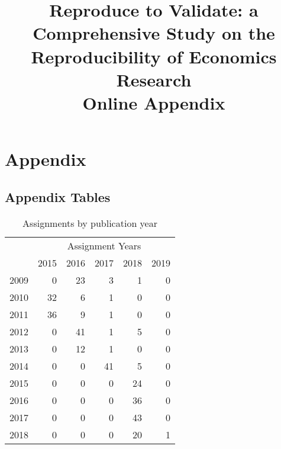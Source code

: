\documentclass{cje_appendix} %
\theoremstyle{plain}%
\theoremstyle{definition}
\theoremstyle{remark}
\begin{document}
\title[]{Reproduce to Validate: a Comprehensive Study on the Reproducibility of Economics Research \\  Online Appendix} %
\authors{} %

\maketitle
\clearpage
\appendix

\section{Appendix}\label{sec:app}
\subsection{Appendix Tables}\label{sec:app:tables}
\begin{table}
\centering
\caption{Assignments by publication year} 
\label{tab:assignments}
\begin{tabular}{rrrrrr}
  &\multicolumn{5}{c}{Assignment Years}\\ & 2015 & 2016 & 2017 & 2018 & 2019 \\ 
  \hline
2009 &   0 &  23 &   3 &   1 &   0 \\ 
  2010 &  32 &   6 &   1 &   0 &   0 \\ 
  2011 &  36 &   9 &   1 &   0 &   0 \\ 
  2012 &   0 &  41 &   1 &   5 &   0 \\ 
  2013 &   0 &  12 &   1 &   0 &   0 \\ 
  2014 &   0 &   0 &  41 &   5 &   0 \\ 
  2015 &   0 &   0 &   0 &  24 &   0 \\ 
  2016 &   0 &   0 &   0 &  36 &   0 \\ 
  2017 &   0 &   0 &   0 &  43 &   0 \\ 
  2018 &   0 &   0 &   0 &  20 &   1 \\ 
   \hline
\end{tabular}
\end{table}
\end{document}
